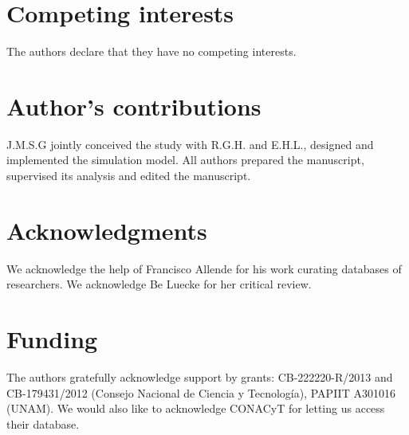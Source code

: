\documentclass{bmcart}
\begin{document}

\begin{backmatter}

\section*{Competing interests}
  The authors declare that they have no competing interests.

\section*{Author's contributions}
    J.M.S.G jointly conceived the study with  R.G.H. and E.H.L., designed and
    implemented the simulation model. All authors prepared the manuscript,
    supervised its analysis and edited the manuscript. 

\section*{Acknowledgments}
    We acknowledge the help of Francisco Allende for his work curating 
databases of researchers. We acknowledge Be Luecke for her critical review.

\section*{Funding}
  The authors gratefully acknowledge support by grants: CB-222220-R/2013 and
CB-179431/2012 (Consejo Nacional de Ciencia y Tecnolog\'ia), PAPIIT A301016 (UNAM). We would also like
to acknowledge CONACyT for letting us access their database.


\end{backmatter}
\end{document}
